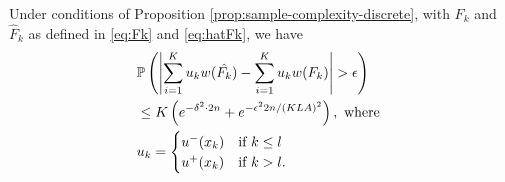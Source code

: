 \begin{proposition}
\label{prop:discrete-first-term}
Under conditions of Proposition \ref{prop:sample-complexity-discrete}, with $F_k$ and $\hat F_k$ as defined in \eqref{eq:Fk} and \eqref{eq:hatFk},  we have
\begin{align}
&\mathbb{P}\left( \left| \sum_{i=1}^K u_{k} w(\hat{F_k}) - \sum_{i=1}^K u_{k} w(F_k) \right| >\epsilon \right)\nonumber\\
& \le K\left(
e^{-\delta^2\cdot 2n} + e^{-\epsilon^2 2n/(KLA)^2}\right), \text{ where }\nonumber\\
&u_k = 
\begin{cases}
   u^{-}(x_{k}) & \text{if   } k \leq l \\
   u^{+}(x_{k}) & \text{if  }  k > l.
\end{cases}  \label{eq:uplusminusxk}
\end{align} 
\end{proposition}

